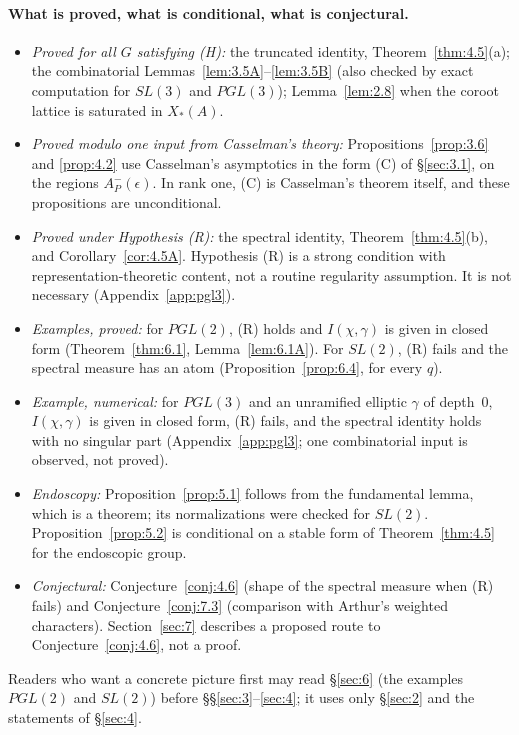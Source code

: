 \documentclass[12pt,letterpaper]{article}
\numberwithin{equation}{section}
\theoremstyle{plain}
\theoremstyle{remark}
\theoremstyle{plain}
\theoremstyle{definition}
\theoremstyle{remark}
\theoremstyle{remark}
\begin{document}
\paragraph{What is proved, what is conditional, what is conjectural.}
\begin{itemize}
\item \emph{Proved for all $G$ satisfying (H):} the truncated identity, Theorem~\ref{thm:4.5}(a); the combinatorial Lemmas~\ref{lem:3.5A}--\ref{lem:3.5B} (also checked by exact computation for $SL(3)$ and $PGL(3)$); Lemma~\ref{lem:2.8} when the coroot lattice is saturated in $X_*(A)$.
\item \emph{Proved modulo one input from Casselman's theory:} Propositions~\ref{prop:3.6} and \ref{prop:4.2} use Casselman's asymptotics in the form (C) of \S\ref{sec:3.1}, on the regions $A^-_P(\epsilon)$. In rank one, (C) is Casselman's theorem itself, and these propositions are unconditional.
\item \emph{Proved under Hypothesis (R):} the spectral identity, Theorem~\ref{thm:4.5}(b), and Corollary~\ref{cor:4.5A}. Hypothesis (R) is a strong condition with representation-theoretic content, not a routine regularity assumption. It is not necessary (Appendix~\ref{app:pgl3}).
\item \emph{Examples, proved:} for $PGL(2)$, (R) holds and $I(\chi,\gamma)$ is given in closed form (Theorem~\ref{thm:6.1}, Lemma~\ref{lem:6.1A}). For $SL(2)$, (R) fails and the spectral measure has an atom (Proposition~\ref{prop:6.4}, for every $q$).
\item \emph{Example, numerical:} for $PGL(3)$ and an unramified elliptic $\gamma$ of depth~$0$, $I(\chi,\gamma)$ is given in closed form, (R) fails, and the spectral identity holds with no singular part (Appendix~\ref{app:pgl3}; one combinatorial input is observed, not proved).
\item \emph{Endoscopy:} Proposition~\ref{prop:5.1} follows from the fundamental lemma, which is a theorem; its normalizations were checked for $SL(2)$. Proposition~\ref{prop:5.2} is conditional on a stable form of Theorem~\ref{thm:4.5} for the endoscopic group.
\item \emph{Conjectural:} Conjecture~\ref{conj:4.6} (shape of the spectral measure when (R) fails) and Conjecture~\ref{conj:7.3} (comparison with Arthur's weighted characters). Section~\ref{sec:7} describes a proposed route to Conjecture~\ref{conj:4.6}, not a proof.
\end{itemize}
Readers who want a concrete picture first may read \S\ref{sec:6} (the examples $PGL(2)$ and $SL(2)$) before \S\S\ref{sec:3}--\ref{sec:4}; it uses only \S\ref{sec:2} and the statements of \S\ref{sec:4}.
\end{document}
